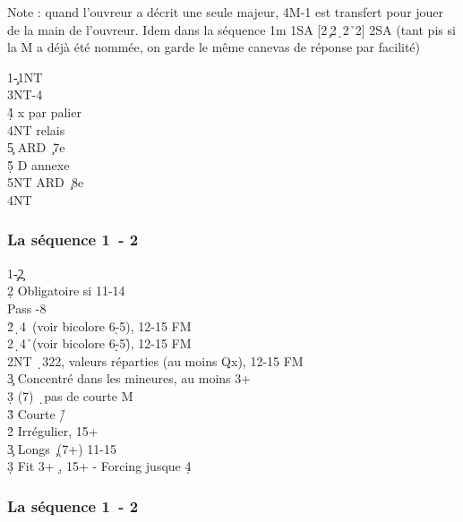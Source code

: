 \documentclass[a4paper]{article}
\begin{document}
Note : quand l’ouvreur a décrit une seule majeur,
4M-1 est transfert pour jouer de la main de l’ouvreur.
Idem dans la séquence 1m 1SA [2\c\ 2\d\ 2\h\ 2\s ] 2SA
(tant pis si la M a déjà été nommée, on garde le même canevas de réponse par facilité)

\begin{bidtable}
1\c-1NT\\
3NT-4\c\\
4\d\h\s \> x par palier\+\\
4NT \> relais\+\\
5\c \> ARD \c\ 7e\\
5\d\h\s \> D annexe\-\\
5NT \> ARD \c\ 8e\-\\
4NT 
\end{bidtable}

\subsubsection{La séquence 1\pdfc\ - 2\pdfc}

\begin{bidtable}
1\c-2\c\+\\
2\d \> Obligatoire si 11-14\+\\
Pass -8\\
2\h {}\d\ 4\s\ (voir bicolore 6\d -5\s ), 12-15 FM\\
2\s {}\d\ 4\h\ (voir bicolore 6\d -5\h ), 12-15 FM\\
2NT \d\ 322, valeurs réparties (au moins Qx), 12-15 FM\\
3\c \> Concentré dans les mineures, au moins 3+\c \\
3\d {} (7) \d\ pas de courte M\\
3\h\s \> Courte \h /\s \-\\
2\h\s \> Irrégulier, 15+\\
3\c \> Longs \c\ (7+) 11-15\\
3\d \> Fit 3+ \d , 15+ - Forcing jusque 4\d \-
\end{bidtable}

\subsubsection{La séquence 1\pdfc\ - 2\pdfd}
\end{document}
